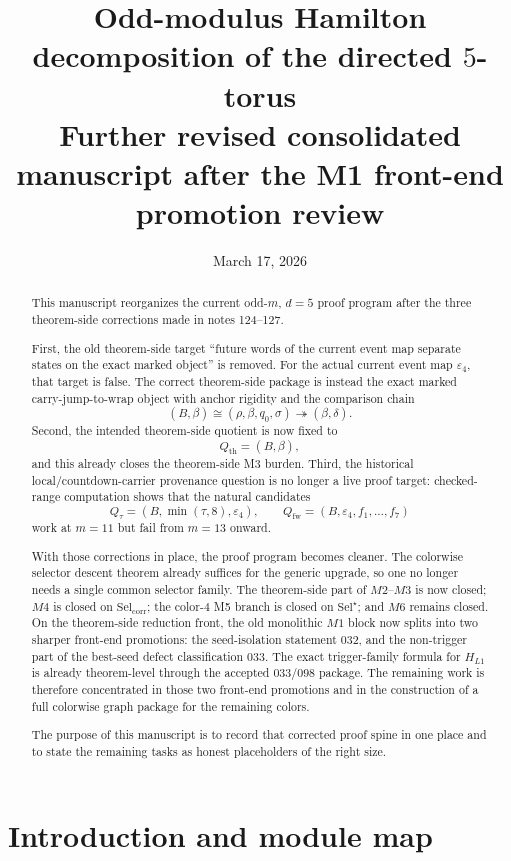 \documentclass[11pt]{article}
\title{Odd-modulus Hamilton decomposition of the directed $5$-torus\\
Further revised consolidated manuscript after the M1 front-end promotion review}
\author{}
\date{March 17, 2026}
\newcommand{\SelCorr}{\mathrm{Sel}_{\mathrm{corr}}}
\newcommand{\SelStar}{\mathrm{Sel}^{\star}}
\newcommand{\eps}{\varepsilon}
\begin{document}
\maketitle

\begin{abstract}
This manuscript reorganizes the current odd-$m$, $d=5$ proof program after the
three theorem-side corrections made in notes 124--127.

First, the old theorem-side target ``future words of the current event map
separate states on the exact marked object'' is removed. For the actual current
event map $\eps_4$, that target is false. The correct theorem-side package is
instead the exact marked carry-jump-to-wrap object with anchor rigidity and the
comparison chain
\[
(B,\beta) \cong (\rho,\beta,q_0,\sigma) \twoheadrightarrow (\beta,\delta).
\]
Second, the intended theorem-side quotient is now fixed to
\[
Q_{\mathrm{th}}=(B,\beta),
\]
and this already closes the theorem-side M3 burden. Third, the historical
local/countdown-carrier provenance question is no longer a live proof target:
checked-range computation shows that the natural candidates
\[
Q_{\tau}=(B,\min(\tau,8),\eps_4),
\qquad
Q_{\mathrm{fw}}=(B,\eps_4,f_1,\dots,f_7)
\]
work at $m=11$ but fail from $m=13$ onward.

With those corrections in place, the proof program becomes cleaner. The
colorwise selector descent theorem already suffices for the generic upgrade, so
one no longer needs a single common selector family. The theorem-side part of
$M2$--$M3$ is now closed; $M4$ is closed on $\SelCorr$; the color-$4$ M5
branch is closed on $\SelStar$; and $M6$ remains closed. On the theorem-side
reduction front, the old monolithic $M1$ block now splits into two sharper
front-end promotions: the seed-isolation statement \textup{032}, and the
non-trigger part of the best-seed defect classification \textup{033}. The
exact trigger-family formula for $H_{L1}$ is already theorem-level through the
accepted \textup{033}/\textup{098} package. The remaining work is therefore
concentrated in those two front-end promotions and in the construction of a
full colorwise graph package for the remaining colors.

The purpose of this manuscript is to record that corrected proof spine in one
place and to state the remaining tasks as honest placeholders of the right
size.
\end{abstract}

\tableofcontents

\section{Introduction and module map}
\end{document}
